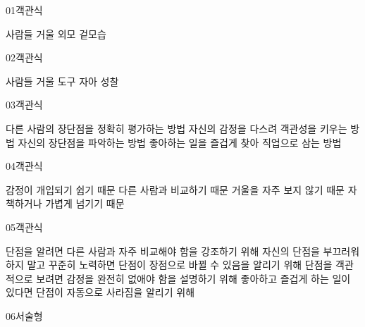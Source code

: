 \documentclass[fs12,seriesSau]{korfarm-base}
\begin{document}

\begin{kfQBlock}{01}{객관식}
\begin{kfChoices}
\kfChoice 사람들
\kfChoice 거울
\kfChoice 외모
\kfChoice 겉모습
\end{kfChoices}
\end{kfQBlock}
\begin{kfQBlock}{02}{객관식}
\begin{kfChoices}
\kfChoice 사람들
\kfChoice 거울
\kfChoice 도구
\kfChoice 자아 성찰
\end{kfChoices}
\end{kfQBlock}
\begin{kfQBlock}{03}{객관식}
\begin{kfChoices}
\kfChoice 다른 사람의 장단점을 정확히 평가하는 방법
\kfChoice 자신의 감정을 다스려 객관성을 키우는 방법
\kfChoice 자신의 장단점을 파악하는 방법
\kfChoice 좋아하는 일을 즐겁게 찾아 직업으로 삼는 방법
\end{kfChoices}
\end{kfQBlock}
\begin{kfQBlock}{04}{객관식}
\begin{kfChoices}
\kfChoice 감정이 개입되기 쉽기 때문
\kfChoice 다른 사람과 비교하기 때문
\kfChoice 거울을 자주 보지 않기 때문
\kfChoice 자책하거나 가볍게 넘기기 때문
\end{kfChoices}
\end{kfQBlock}
\begin{kfQBlock}{05}{객관식}
\begin{kfChoices}
\kfChoice 단점을 알려면 다른 사람과 자주 비교해야 함을 강조하기 위해
\kfChoice 자신의 단점을 부끄러워하지 말고 꾸준히 노력하면 단점이 장점으로 바뀔 수 있음을 알리기 위해
\kfChoice 단점을 객관적으로 보려면 감정을 완전히 없애야 함을 설명하기 위해
\kfChoice 좋아하고 즐겁게 하는 일이 있다면 단점이 자동으로 사라짐을 알리기 위해
\end{kfChoices}
\end{kfQBlock}
\begin{kfQBlock}{06}{서술형}
\end{kfQBlock}
\end{document}
